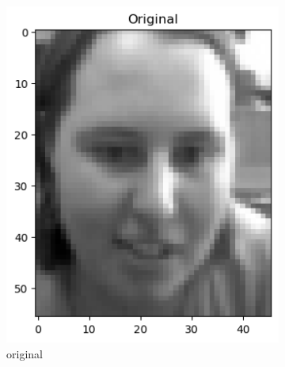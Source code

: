 \begin{figure}[htbp]
	\centering
	\begin{subfigure}[t]{0.2\linewidth}
		\centering
		\includegraphics[width=\linewidth]{image/q1_recon_train_original.png}
		\caption{original}
		\label{fig:train_re_original}
	\end{subfigure}%
	\hfill
	\begin{subfigure}[t]{0.2\linewidth}
		\centering

\end{subfigure}
\end{figure}
